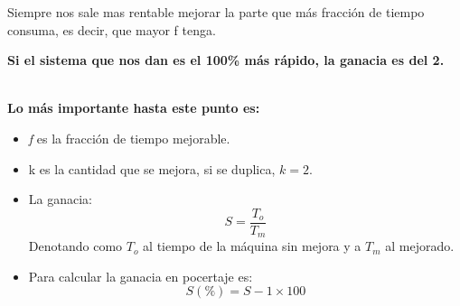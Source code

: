 Siempre nos sale mas rentable mejorar la parte que más fracción de tiempo consuma, es decir, que mayor f tenga.

\textbf{Si el sistema que nos dan es el 100\% más rápido, la ganacia es del 2.}
\\\\

\begin{tcolorbox}[colback=blue!20, colframe=blue]
\textbf{Lo más importante hasta este punto es:}

\begin{itemize}
    \item \textit{f} es la fracción de tiempo mejorable.
    \item k es la cantidad que se mejora, si se duplica, $k=2$.
    \item La ganacia: 
    \begin{equation}
        S=\frac{T_o}{T_m}
    \end{equation}
    Denotando como $T_o$ al tiempo de la máquina sin mejora y a $T_m$ al mejorado.
    \item Para calcular la ganacia en pocertaje es:
    \begin{equation}
        S(\%) = S-1 \times 100
    \end{equation}
\end{itemize}
\end{tcolorbox}
